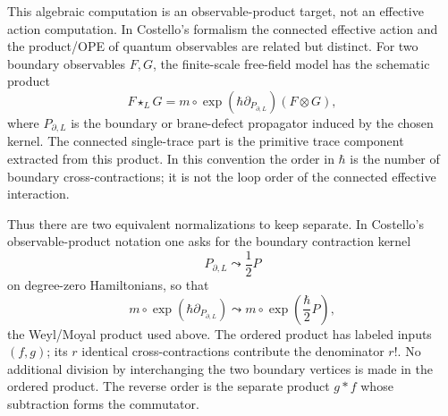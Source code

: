 \documentclass[11pt]{memoir}
\begin{document}
This algebraic computation is an observable-product target, not an effective
action computation. In Costello's formalism the connected effective action and
the product/OPE of quantum observables are related but distinct. For two
boundary observables $F,G$, the finite-scale free-field model has the schematic
product
$$F\star_L G=m\circ\exp(\hbar\partial_{P_{\partial,L}})(F\otimes G),$$
where $P_{\partial,L}$ is the boundary or brane-defect propagator induced by the
chosen kernel. The connected single-trace part is the primitive trace
component extracted from this product. In this convention the order in $\hbar$ is
the number of boundary cross-contractions; it is not the loop order of the
connected effective interaction.

Thus there are two equivalent normalizations to keep separate. In Costello's
observable-product notation one asks for the boundary contraction kernel
$$P_{\partial,L}\leadsto \frac12P$$
on degree-zero Hamiltonians, so that
$$m\circ\exp(\hbar\partial_{P_{\partial,L}})
  \leadsto m\circ\exp\left(\frac{\hbar}{2}P\right),$$
the Weyl/Moyal product used above. The ordered product has labeled inputs
$(f,g)$; its $r$ identical cross-contractions contribute the denominator $r!$.
No additional division by interchanging the two boundary vertices is made in
the ordered product. The reverse order is the separate product $g*f$ whose
subtraction forms the commutator.
\end{document}
